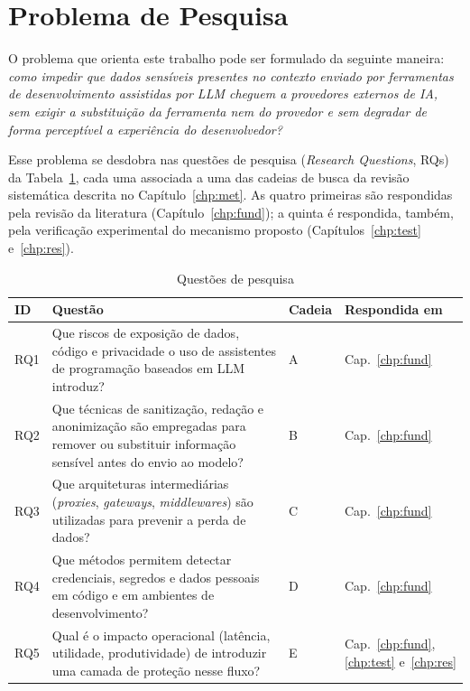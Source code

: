 \section{Problema de Pesquisa}
\label{sec:intro_problema}

O problema que orienta este trabalho pode ser formulado da seguinte maneira: \textit{como impedir que dados sensíveis presentes no contexto enviado por ferramentas de desenvolvimento assistidas por LLM cheguem a provedores externos de IA, sem exigir a substituição da ferramenta nem do provedor e sem degradar de forma perceptível a experiência do desenvolvedor?}

Esse problema se desdobra nas questões de pesquisa (\textit{Research Questions}, RQs) da Tabela~\ref{tab:rqs}, cada uma associada a uma das cadeias de busca da revisão sistemática descrita no Capítulo~\ref{chp:met}. As quatro primeiras são respondidas pela revisão da literatura (Capítulo~\ref{chp:fund}); a quinta é respondida, também, pela verificação experimental do mecanismo proposto (Capítulos~\ref{chp:test} e~\ref{chp:res}).

\begin{table}[htb]
\centering
\caption{Questões de pesquisa}\label{tab:rqs}
\small
\begin{tabular}{|p{1.1cm}|p{9.3cm}|p{1.6cm}|p{2.6cm}|}
\hline
\textbf{ID} & \textbf{Questão} & \textbf{Cadeia} & \textbf{Respondida em} \\ \hline
RQ1 & Que riscos de exposição de dados, código e privacidade o uso de assistentes de programação baseados em LLM introduz? & A & Cap.~\ref{chp:fund} \\ \hline
RQ2 & Que técnicas de sanitização, redação e anonimização são empregadas para remover ou substituir informação sensível antes do envio ao modelo? & B & Cap.~\ref{chp:fund} \\ \hline
RQ3 & Que arquiteturas intermediárias (\textit{proxies}, \textit{gateways}, \textit{middlewares}) são utilizadas para prevenir a perda de dados? & C & Cap.~\ref{chp:fund} \\ \hline
RQ4 & Que métodos permitem detectar credenciais, segredos e dados pessoais em código e em ambientes de desenvolvimento? & D & Cap.~\ref{chp:fund} \\ \hline
RQ5 & Qual é o impacto operacional (latência, utilidade, produtividade) de introduzir uma camada de proteção nesse fluxo? & E & Cap.~\ref{chp:fund}, \ref{chp:test} e~\ref{chp:res} \\ \hline
\end{tabular}
\end{table}

